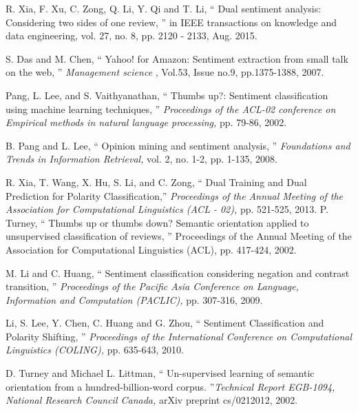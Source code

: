 \documentclass[oneside,a4paper,12pt]{pictreport}
\begin{document}
\begin{thebibliography}{20}



R. Xia, F. Xu, C. Zong, Q. Li, Y. Qi and T. Li, `` Dual sentiment analysis: Considering  two  sides  of  one 
review, '' in IEEE transactions on knowledge and data engineering, vol. 27, no. 8, pp. 2120
-
2133, Aug. 2015.

  S. Das and M. Chen, `` Yahoo! for Amazon: Sentiment extraction from small talk on the web, '' {\em Management science} , Vol.53, Issue no.9, pp.1375-1388, 2007.

  
  
  Pang, L. Lee, and S. Vaithyanathan, `` Thumbs up?: Sentiment classification using machine learning techniques, '' {\em Proceedings of the ACL-02 conference on Empirical methods in natural language processing,}
  pp. 79-86, 2002.
  
  B. Pang and L. Lee, `` Opinion mining and sentiment analysis, '' {\em Foundations
  and Trends in Information Retrieval,} vol. 2, no. 1-2, pp. 1-135, 2008.
  
  R. Xia, T. Wang, X. Hu, S. Li, and C. Zong, `` Dual Training and Dual
Prediction for Polarity Classification,'' {\em Proceedings of the Annual 
Meeting of the Association for Computational Linguistics (ACL - 02),} pp. 521-525,
2013.
  P. Turney, `` Thumbs up or thumbs down? Semantic orientation applied to unsupervised classification of reviews, '' Proceedings of the Annual Meeting of the Association for Computational Linguistics (ACL), pp. 417-424, 2002.

  
  M. Li and C. Huang, `` Sentiment classification considering negation
and contrast transition, '' {\em Proceedings of the Pacific Asia Conference on
Language, Information and Computation (PACLIC),}  pp. 307-316, 2009.


  Li, S. Lee, Y. Chen, C. Huang and G. Zhou, `` Sentiment 
  Classification and Polarity Shifting, '' {\em Proceedings of the International Conference on
  Computational Linguistics (COLING),} pp. 635-643, 2010.
  
 
  
  D. Turney and Michael L. Littman, `` Un-supervised learning of semantic orientation from
a hundred-billion-word corpus. ''{\em Technical Report
EGB-1094, National Research Council Canada,} arXiv preprint cs/0212012, 2002.


\end{thebibliography}
\end{document}
